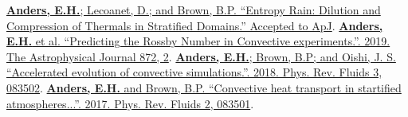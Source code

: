 


\footnotesize
\href{https://ui.adsabs.harvard.edu/abs/2019arXiv190602342A/abstract}{\textbf{Anders, E.H.}; Lecoanet, D.; and Brown, B.P. ``Entropy Rain: Dilution and Compression of Thermals in Stratified Domains.'' Accepted to ApJ}.
\newline
\href{https://iopscience.iop.org/article/10.3847/1538-4357/aaff61}{\textbf{Anders, E.H.} et al. ``Predicting the Rossby Number in Convective experiments.''. 2019. The Astrophysical Journal 872, 2}.
\newline
\href{https://journals.aps.org/prfluids/abstract/10.1103/PhysRevFluids.3.083502}{\textbf{Anders, E.H.}; Brown, B.P; and Oishi, J. S. ``Accelerated evolution of convective simulations.''. 2018.  Phys. Rev. Fluids 3, 083502}.
\newline
\href{https://journals.aps.org/prfluids/abstract/10.1103/PhysRevFluids.2.083501}{\textbf{Anders, E.H.} and Brown, B.P. ``Convective heat transport in startified atmospheres...''. 2017.  Phys. Rev. Fluids 2, 083501}.
\normalsize

\hspace{-0.25cm}
